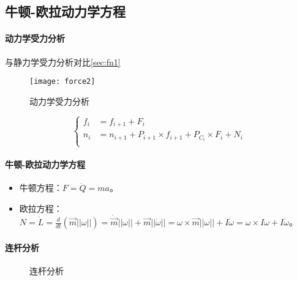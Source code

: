\documentclass[
12pt, %
a4paper, 
oneside, %
headinclude,footinclude, %
]{scrartcl}
\begin{document}
\subsection{牛顿-欧拉动力学方程}
\paragraph{动力学受力分析}\label{sec:fn2}
与静力学受力分析对比\ref{sec:fn1}

\begin{figure}[H]
\centering 
\texttt{[image: force2]} 
\caption[动力学受力分析]{动力学受力分析}
\end{figure}

$$
\begin{cases}
f_i &= f_{i + 1} + F_i \\
n_i &= n_{i + 1} + P_{i + 1} \times f_{i + 1} + P_{C_i} \times F_i + N_i \\
\end{cases}
$$
\paragraph{牛顿-欧拉动力学方程}
\begin{itemize}
\item 牛顿方程：$ F = \dot{Q} = ma $。
\item 欧拉方程：$ N = \dot{L} = \frac{d}{dt}(\vec{m}||\omega||) = \dot{\vec{m}}||\omega|| + \vec{m}||\dot{\omega}|| = \omega \times \vec{m}||\omega|| + I\dot{\omega} = \omega \times I\omega + I\dot{\omega} $。
\end{itemize}
\paragraph{连杆分析}
\begin{figure}[H]
\centering
{} \quad
{}
\caption[连杆分析]{连杆分析}
\end{figure}
\end{document}
